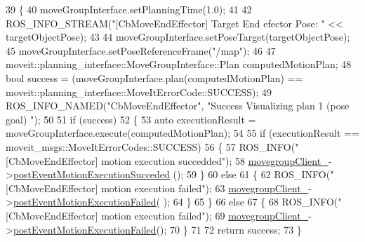 \begin{DoxyCode}
39 \{
40     moveGroupInterface.setPlanningTime(1.0);
41 
42     ROS\_INFO\_STREAM(\textcolor{stringliteral}{"[CbMoveEndEffector] Target End efector Pose: "} << targetObjectPose);
43 
44     moveGroupInterface.setPoseTarget(targetObjectPose);
45     moveGroupInterface.setPoseReferenceFrame(\textcolor{stringliteral}{"/map"});
46 
47     moveit::planning\_interface::MoveGroupInterface::Plan computedMotionPlan;
48     \textcolor{keywordtype}{bool} success = (moveGroupInterface.plan(computedMotionPlan) == 
      moveit::planning\_interface::MoveItErrorCode::SUCCESS);
49     ROS\_INFO\_NAMED(\textcolor{stringliteral}{"CbMoveEndEffector"}, \textcolor{stringliteral}{"Success Visualizing plan 1 (pose goal) %
      "});
50 
51     \textcolor{keywordflow}{if} (success)
52     \{
53         \textcolor{keyword}{auto} executionResult = moveGroupInterface.execute(computedMotionPlan);
54 
55         \textcolor{keywordflow}{if} (executionResult == moveit\_msgs::MoveItErrorCodes::SUCCESS)
56         \{
57             ROS\_INFO(\textcolor{stringliteral}{"[CbMoveEndEffector] motion execution succedded"});
58             \hyperlink{classsm__moveit_1_1cl__movegroup_1_1CbMoveEndEffector_a0bd042d152b3dbf881679c43c7330513}{movegroupClient\_}->\hyperlink{classsm__moveit_1_1cl__movegroup_1_1ClMoveGroup_ab4585dcd850286ed168a25a3ddd56eed}{postEventMotionExecutionSucceded}
      ();
59         \}
60         \textcolor{keywordflow}{else}
61         \{
62             ROS\_INFO(\textcolor{stringliteral}{"[CbMoveEndEffector] motion execution failed"});
63             \hyperlink{classsm__moveit_1_1cl__movegroup_1_1CbMoveEndEffector_a0bd042d152b3dbf881679c43c7330513}{movegroupClient\_}->\hyperlink{classsm__moveit_1_1cl__movegroup_1_1ClMoveGroup_a8d0530e2ad4e2ce2dc9a59ccea9ce69a}{postEventMotionExecutionFailed}(
      );
64         \}
65     \}
66     \textcolor{keywordflow}{else}
67     \{
68         ROS\_INFO(\textcolor{stringliteral}{"[CbMoveEndEffector] motion execution failed"});
69         \hyperlink{classsm__moveit_1_1cl__movegroup_1_1CbMoveEndEffector_a0bd042d152b3dbf881679c43c7330513}{movegroupClient\_}->\hyperlink{classsm__moveit_1_1cl__movegroup_1_1ClMoveGroup_a8d0530e2ad4e2ce2dc9a59ccea9ce69a}{postEventMotionExecutionFailed}();
70     \}
71 
72     \textcolor{keywordflow}{return} success;
73 \}
\end{DoxyCode}


